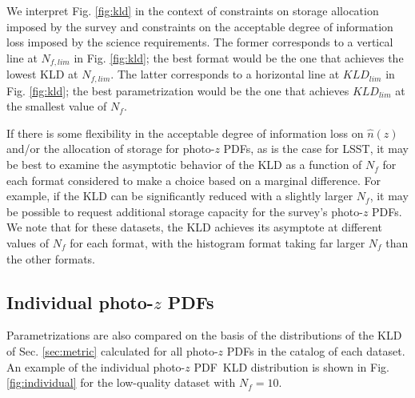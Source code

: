 \documentclass[\docopts]{\docclass}
\newcommand{\pz}{photo-$z$ PDF}
\begin{document}
We interpret Fig. \ref{fig:kld} in the context of constraints on storage 
allocation imposed by the survey and constraints on the acceptable degree of 
information loss imposed by the science requirements.  The former corresponds 
to a vertical line at $N_{f, lim}$ in Fig. \ref{fig:kld}; the best format would 
be the one that achieves the lowest KLD at $N_{f, lim}$.  The latter 
corresponds to a horizontal line at $KLD_{lim}$ in Fig. \ref{fig:kld}; the best 
parametrization would be the one that achieves $KLD_{lim}$ at the smallest 
value of $N_{f}$.

If there is some flexibility in the acceptable degree of information loss on 
$\hat{n}(z)$ and/or the allocation of storage for \pz s, as is the case for 
LSST, it may be best to examine the asymptotic behavior of the KLD as a 
function of $N_{f}$ for each format considered to make a choice based on a 
marginal difference.  For example, if the KLD can be significantly reduced with 
a slightly larger $N_{f}$, it may be possible to request additional storage 
capacity for the survey's \pz s.  We note that for these datasets, the KLD 
achieves its asymptote at different values of $N_{f}$ for each format, with the 
histogram format taking far larger $N_{f}$ than the other formats.

\subsection{Individual \pz s}
\label{sec:individual_results}

Parametrizations are also compared on the basis of the distributions of the KLD 
of Sec. \ref{sec:metric} calculated for all \pz s in the catalog of each 
dataset.  An example of the individual \pz\ KLD distribution is shown in Fig. 
\ref{fig:individual} for the low-quality dataset with $N_{f}=10$.
\end{document}
